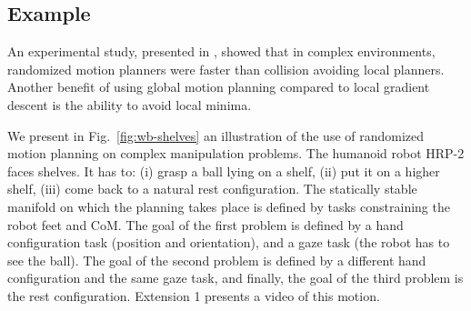 \documentclass{article}
\begin{document}
\subsection{Example}

An experimental study, presented in  \cite{dalibard09}, showed that
in complex environments, randomized motion planners were faster than
collision avoiding local planners. Another benefit of using global motion
planning compared to local gradient descent is the ability to avoid local 
minima. 


We present in Fig.~\ref{fig:wb-shelves} an illustration of 
the use of randomized motion planning 
on complex manipulation problems. The humanoid robot HRP-2 faces shelves. It has to: (i) grasp
a ball lying on a shelf, (ii) put it on a higher shelf, (iii) come back to a natural
rest configuration. The statically stable manifold on which the planning takes place is
defined by tasks constraining the robot feet and CoM. The goal of the first problem
is defined by a hand configuration task (position and orientation), and a gaze task
(the robot has to see the ball). The goal of the second problem is defined by a 
different hand configuration and the same gaze task,
and finally, the goal of the third problem is the rest configuration.
Extension 1 presents a video of this motion.
\end{document}
